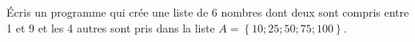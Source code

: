 
Écris un programme qui crée une liste de 6 nombres dont deux sont compris entre  1 et 9 et les 4 autres sont pris dans la liste $A =\left\lbrace 10;25;50;75;100\right\rbrace $. 